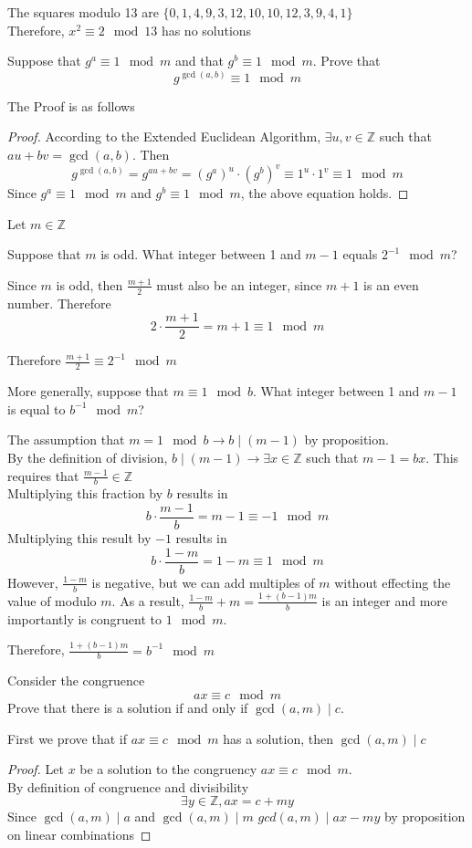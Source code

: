 \documentclass[12pt]{article}
\begin{document}
\solution
The squares modulo 13 are $\{0,1,4,9,3,12,10,10,12,3,9,4,1\}$\\
Therefore, $x^2\equiv 2\mod 13$ has no solutions

\problem Suppose that $g^a\equiv 1\mod m$ and that $g^b\equiv 1\mod m$. Prove that
\[g^{\gcd(a,b)}\equiv 1\mod m\]

\solution The Proof is as follows
\begin{proof}
    According to the Extended Euclidean Algorithm, $\exists u,v\in\mathbb{Z}$ such that $au+bv=\gcd(a,b)$. Then
    \[g^{\gcd(a,b)}=g^{au+bv}=(g^a)^u\cdot(g^b)^v\equiv1^u\cdot1^v\equiv 1\mod{m}\]
    Since $g^a\equiv1\mod{m}$ and $g^b\equiv1\mod{m}$, the above equation holds.
\end{proof}

\newpage
\problem Let $m\in\mathbb{Z}$

\subproblem Suppose that $m$ is odd. What integer between 1 and $m-1$ equals $2^{-1}\mod{m}$?

\solution
Since $m$ is odd, then $\frac{m+1}{2}$ must also be an integer, since $m+1$ is an even number. Therefore
\[2\cdot\frac{m+1}{2}=m+1\equiv1\mod{m}\]

\noindent
Therefore $\frac{m+1}{2}\equiv2^{-1}\mod{m}$

\subproblem More generally, suppose that $m\equiv 1\mod b$. What integer between 1 and $m-1$ is equal to $b^{-1}\mod m$?

\solution
The assumption that $m=1\mod{b}\rightarrow b\mid (m-1)$ by proposition.\\
By the definition of division, $b\mid (m-1)\rightarrow\exists x\in\mathbb{Z}$ such that $m-1=bx$. This requires that $\frac{m-1}{b}\in\mathbb{Z}$\\
Multiplying this fraction by $b$ results in
\[b\cdot\frac{m-1}{b}=m-1\equiv-1\mod{m}\]
Multiplying this result by $-1$ results in
\[b\cdot\frac{1-m}{b}=1-m\equiv1\mod{m}\]
However, $\frac{1-m}{b}$ is negative, but we can add multiples of $m$ without effecting the value of modulo $m$. As a result, $\frac{1-m}{b}+m=\frac{1+(b-1)m}{b}$ is an integer and more importantly is congruent to $1\mod{m}$.

\noindent
Therefore, $\frac{1+(b-1)m}{b}=b^{-1}\mod{m}$

\newpage
\problem Consider the congruence
\[
    ax\equiv c\mod m
\]
Prove that there is a solution if and only if $\gcd(a,m)\mid c$.

\solution
First we prove that if $ax\equiv c\mod{m}$ has a solution, then $\gcd(a,m)\mid c$
\begin{proof}
    Let $x$ be a solution to the congruency $ax\equiv c\mod{m}$.\\
    By definition of congruence and divisibility
    \[\exists y\in\mathbb{Z},ax=c+my\]
    Since $\gcd(a,m)\mid a$ and $\gcd(a,m)\mid m$ $gcd(a,m)\mid ax-my$ by proposition on linear combinations
\end{proof}
\end{document}
